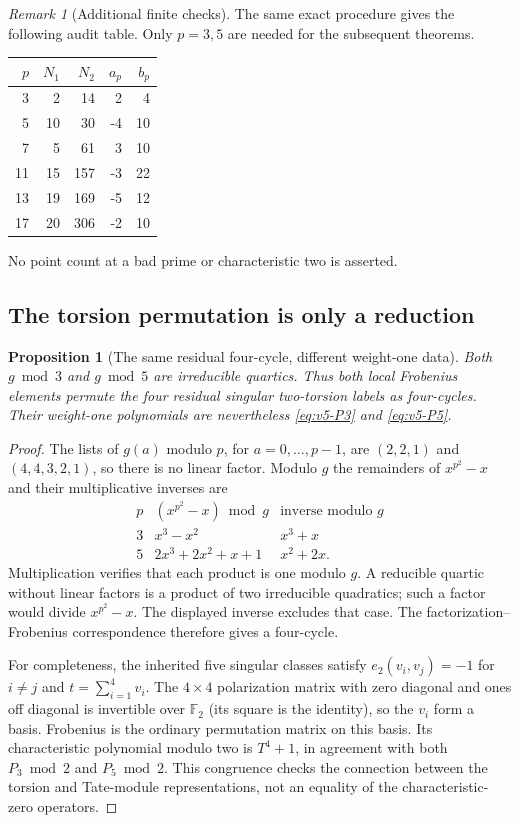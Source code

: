 \documentclass[11pt]{article}
\newtheorem{proposition}[proposition]{Proposition}
\theoremstyle{definition}
\theoremstyle{remark}
\newtheorem{remark}[remark]{Remark}
\newcommand{\F}{\mathbb F}
\begin{document}
\begin{remark}[Additional finite checks]
The same exact procedure gives the following audit table. Only $p=3,5$ are
needed for the subsequent theorems.
\begin{center}
\begin{tabular}{rrrrr}
\toprule $p$&$N_1$&$N_2$&$a_p$&$b_p$\\\midrule
3&2&14&2&4\\5&10&30&-4&10\\7&5&61&3&10\\
11&15&157&-3&22\\13&19&169&-5&12\\17&20&306&-2&10\\\bottomrule
\end{tabular}
\end{center}
No point count at a bad prime or characteristic two is asserted.
\end{remark}

\subsection{The torsion permutation is only a reduction}
\begin{proposition}[The same residual four-cycle, different weight-one data]
\label{prop:v5-fourcycles}
Both $g\bmod3$ and $g\bmod5$ are irreducible quartics. Thus both local
Frobenius elements permute the four residual singular two-torsion labels
as four-cycles. Their weight-one polynomials are nevertheless
\eqref{eq:v5-P3} and \eqref{eq:v5-P5}.
\end{proposition}
\begin{proof}
The lists of $g(a)$ modulo $p$, for $a=0,\ldots,p-1$, are
$(2,2,1)$ and $(4,4,3,2,1)$, so there is no linear factor. Modulo $g$ the
remainders of $x^{p^2}-x$ and their multiplicative inverses are
\[
 \begin{array}{c|cc}
 p&(x^{p^2}-x)\bmod g&\text{inverse modulo }g\\\hline
 3&x^3-x^2&x^3+x\\
 5&2x^3+2x^2+x+1&x^2+2x.
 \end{array}
\]
Multiplication verifies that each product is one modulo $g$. A reducible
quartic without linear factors is a product of two irreducible quadratics;
such a factor would divide $x^{p^2}-x$. The displayed inverse excludes that
case. The factorization--Frobenius correspondence therefore gives a
four-cycle.

For completeness, the inherited five singular classes satisfy
$e_2(v_i,v_j)=-1$ for $i\ne j$ and $t=\sum_{i=1}^4v_i$. The $4\times4$
polarization matrix with zero diagonal and ones off diagonal is invertible
over $\F_2$ (its square is the identity), so the $v_i$ form a basis.
Frobenius is the ordinary permutation matrix on this basis. Its
characteristic polynomial modulo two is $T^4+1$, in agreement with both
$P_3\bmod2$ and $P_5\bmod2$. This congruence checks the connection between
the torsion and Tate-module representations, not an equality of the
characteristic-zero operators.
\end{proof}
\end{document}
